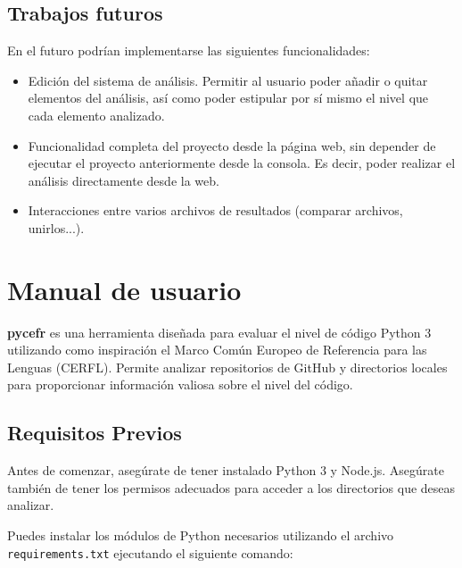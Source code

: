 \documentclass[a4paper, 12pt]{book}
\begin{document}
\section{Trabajos futuros}
\label{sec:trabajos_futuros}

En el futuro podrían implementarse las siguientes funcionalidades:

\begin{itemize}
    \item Edición del sistema de análisis. Permitir al usuario poder añadir o quitar elementos del análisis, así como poder estipular por sí mismo el nivel que cada elemento analizado.
    \item Funcionalidad completa del proyecto desde la página web, sin depender de ejecutar el proyecto anteriormente desde la consola. Es decir, poder realizar el análisis directamente desde la web.
    \item Interacciones entre varios archivos de resultados (comparar archivos, unirlos...). 
\end{itemize}



\cleardoublepage
\appendix
\chapter{Manual de usuario}
\label{app:manual}

\textbf{pycefr} es una herramienta diseñada para evaluar el nivel de código Python 3 utilizando como inspiración el Marco Común Europeo de Referencia para las Lenguas (CERFL). Permite analizar repositorios de GitHub y directorios locales para proporcionar información valiosa sobre el nivel del código.

\section{Requisitos Previos}
Antes de comenzar, asegúrate de tener instalado Python 3 y Node.js. Asegúrate también de tener los permisos adecuados para acceder a los directorios que deseas analizar.

Puedes instalar los módulos de Python necesarios utilizando el archivo \texttt{requirements.txt} ejecutando el siguiente comando:
\end{document}
